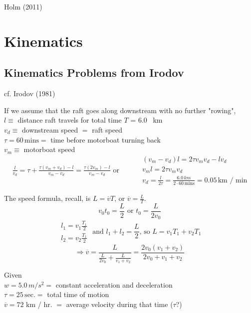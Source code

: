 Holm (2011) \cite{dgdt:Holm2011}

\section{Kinematics}

\subsection{Kinematics Problems from Irodov}

cf. Irodov (1981) \cite{dgdt:Irod1981}

 If we assume that the raft goes along downstream with no further "rowing", \\
$l \equiv $ distance raft travels for total time $T$ = 6.0 \, km \\
$v_d \equiv $ downstream speed $=$ raft speed \\
$\tau = 60 \, \text{mins} = $ time before motorboat turning back \\
$v_m \equiv $ motorboat speed \\

\[
\begin{gathered}
	\frac{l}{v_d} = \tau + \frac{ \tau (v_m + v_d) - l }{ v_m - v_d} = \frac{ \tau (2 v_m) - l }{ v_m - v_d } \text{ or } 
\end{gathered} \quad \quad \, \begin{gathered}
(v_m - v_d) l = 2 \tau v_m v_d - l v_d \\
v_m l = 2\tau v_m v_d \\
\boxed{ v_d =  \frac{l}{2\tau } }= \frac{6.0 \, km }{ 2 \cdot 60 \, \text{mins}} = 0.05 \,  \text{km / min}
\end{gathered}
\]

 The speed formula, recall, is $L = \overline{v} T$, or $\overline{v} = \frac{L}{T}$. 
\[
v_0 t_0 = \frac{L}{2} \text{ or } t_0 = \frac{L}{2 v_0} 
\]
\[
\begin{gathered}
	l_1 = v_1 \frac{T_1}{2} \\
	l_2 = v_2 \frac{T_1}{2} 
\end{gathered} \text{ and }
l_1 + l_2  = \frac{L}{2} \text{, so } L = v_1 T_1 + v_2  T_1 
\]
\[
\Longrightarrow \overline{v} = \frac{L }{ \frac{L}{2v_0} + \frac{L}{v_1 + v_2} } = \frac{2 v_0 (v_1 + v_2) }{ 2v_0 + v_1 + v_2}
\]

 Given \\
$w = 5.0 \, m/s^2 = $ constant acceleration and deceleration \\
$\tau = 25 \, \text{sec.} = $ total time of motion \\
$\overline{v} = 72 $ km / hr. $=$ average velocity during that time ($\tau$?) \\

